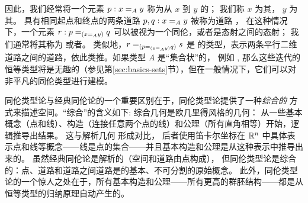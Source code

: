 因此，我们经常将一个元素 $p : \id[A]{x}{y}$ 称为从 $x$ 到 $y$ 的；
我们称 $x$ 为其，
$y$ 为其。
具有相同起点和终点的两条道路 $p,q : \id[A]{x}{y}$ 被称为道路
，
在这种情况下，一个元素 $r : \id[{(\id[A]{x}{y})}]{p}{q}$ 可以被视为一个同伦，或者是态射之间的态射；
我们通常将其称为
或者。
类似地，$\id[{(\id[{(\id[A]{x}{y})}]{p}{q})}]{r}{s}$ 是
的类型，表示两条平行二维道路之间的道路，依此类推。如果类型 $A$ 是“集合状”的，
例如 \nat, 那么这些迭代的恒等类型将是无趣的（参见第\ref{sec:basics-sets}节），但在一般情况下，它们可以对非平凡的同伦类型进行建模。


同伦类型论与经典同伦论的一个重要区别在于，同伦类型论提供了一种\emph{综合的}
方式来描述空间。``综合''的含义如下:
综合几何是欧几里得风格的几何\cite{Euclid}：
从一些基本概念（点和线）、构造（连接任意两个点的线）和公理（所有直角相等）开始，逻辑推导出结果。
这与解析几何 形成对比，
后者使用笛卡尔坐标在 $\R^n$ 中具体表示点和线等概念——线是点的集合——并且基本构造和公理是从这种表示中推导出来的。
虽然经典同伦论是解析的（空间和道路由点构成），
但同伦类型论是综合的：点、道路和道路之间道路是的基本、不可分割的原始概念。
此外，同伦类型论的一个惊人之处在于，所有基本构造和公理——所有更高的群胚结构——都是从恒等类型的归纳原理自动产生的。

